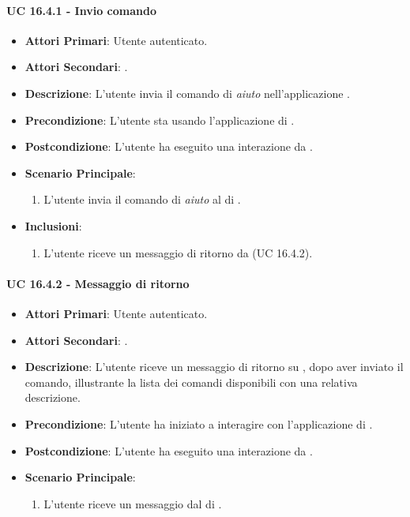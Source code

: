 		\paragraph{UC 16.4.1 - Invio comando}
		\begin{itemize}
			\item \textbf{Attori Primari}: Utente autenticato.
			\item \textbf{Attori Secondari}: .
			\item \textbf{Descrizione}: L'utente invia il comando di \textit{aiuto} nell'applicazione .
			\item \textbf{Precondizione}: L'utente sta usando l'applicazione di .
			\item \textbf{Postcondizione}: L'utente ha eseguito una interazione da .
			\item \textbf{Scenario Principale}:
			\begin{enumerate}
				\item L'utente invia il comando di \textit{aiuto} al  di .
			\end{enumerate}
			\item \textbf{Inclusioni}:
			\begin{enumerate}
				\item L'utente riceve un messaggio di ritorno da  (UC 16.4.2).
			\end{enumerate}
		\end{itemize}

		\paragraph{UC 16.4.2 - Messaggio di ritorno}
		\begin{itemize}
			\item \textbf{Attori Primari}: Utente autenticato.
			\item \textbf{Attori Secondari}: .
			\item \textbf{Descrizione}: L'utente riceve un messaggio di ritorno su , dopo aver inviato il comando, illustrante la lista dei comandi disponibili con una relativa descrizione.
			\item \textbf{Precondizione}: L'utente ha iniziato a interagire con l'applicazione di .
			\item \textbf{Postcondizione}: L'utente ha eseguito una interazione da .
			\item \textbf{Scenario Principale}:
			\begin{enumerate}
				\item L'utente riceve un messaggio dal  di .
			\end{enumerate}
		\end{itemize}	


